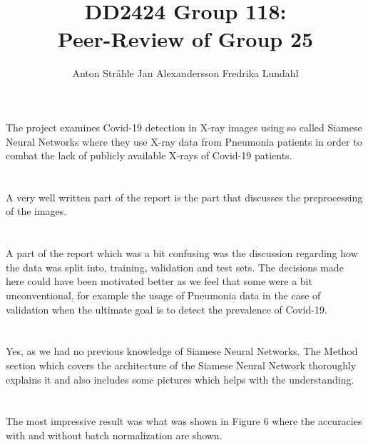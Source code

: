 \documentclass{article}
\title{DD2424 Group 118: \\ Peer-Review of Group 25}
\author{%
  Anton Stråhle \And Jan Alexandersson \And Fredrika Lundahl}
\begin{document}
	
\maketitle

\section{}

The project examines Covid-19 detection in X-ray images using so called Siamese Neural Networks where they use X-ray data from Pneumonia patients in order to combat the lack of publicly available X-rays of Covid-19 patients.

\section{}

A very well written part of the report is the part that discusses the preprocessing of the images.

\section{}

A part of the report which was a bit confusing was the discussion regarding how the data was split into, training, validation and test sets. The decisions made here could have been motivated better as we feel that some were a bit unconventional, for example the usage of Pneumonia data in the case of validation when the ultimate goal is to detect the prevalence of Covid-19.

\section{}

Yes, as we had no previous knowledge of Siamese Neural Networks. The Method section which covers the architecture of the Siamese Neural Network thoroughly explains it and also includes some pictures which helps with the understanding.

\section{}

The most impressive result was what was shown in Figure 6 where the accuracies with and without batch normalization are shown.

\section{}
\end{document}
